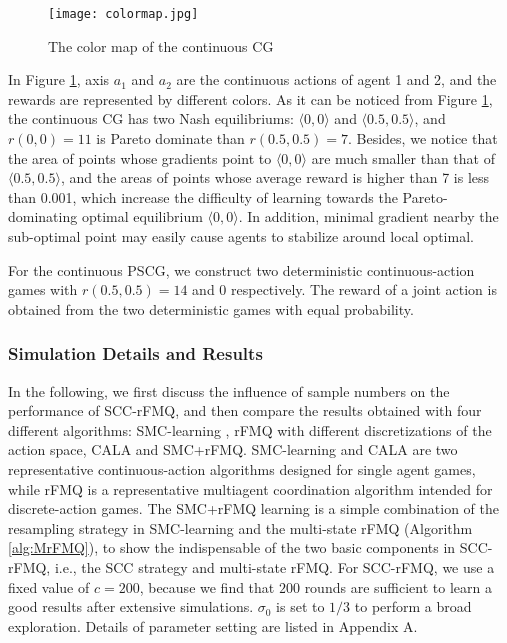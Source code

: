 \documentclass[journal,transmag]{IEEEtran}
\begin{document}


\begin{figure}[h!]
\centering
\texttt{[image: colormap.jpg]}
\caption{The color map of the continuous CG}
\label{fig:colormap}
\end{figure}

In Figure \ref{fig:colormap}, axis $a_1$ and $a_2$ are the continuous actions of agent 1 and 2, and the rewards are represented by different colors. As it can be noticed from Figure \ref{fig:colormap}, the continuous CG has two Nash equilibriums: $\langle 0,0\rangle$ and $\langle 0.5,0.5\rangle$, and $r(0,0)=11$ is Pareto dominate than $r(0.5,0.5)=7$. Besides, we notice that the area of points whose gradients point to $\langle 0,0\rangle$ are much smaller than that of $\langle 0.5,0.5\rangle$,  and the areas of points whose average reward is higher than 7 is less than 0.001, which increase the difficulty of learning towards the Pareto-dominating optimal equilibrium $\langle 0,0\rangle$. In addition, minimal gradient nearby the sub-optimal point may easily cause agents to stabilize around local optimal.

For the continuous PSCG, we construct two deterministic continuous-action games with $r(0.5,0.5)=14$ and $0$ respectively. The reward of a joint action is obtained from the two deterministic games with equal probability.

\subsubsection{Simulation Details and Results}

In the following, we first discuss the influence of sample numbers on the performance of SCC-rFMQ, and then compare the results obtained with four different algorithms: SMC-learning \cite{Lazaric2007Reinforcement}, rFMQ \cite{Matignon2012} with different discretizations of the action space, CALA \cite{Thathachar2004Networks} and SMC+rFMQ. SMC-learning and CALA are two representative continuous-action algorithms designed for single agent games, while rFMQ is a representative multiagent coordination algorithm intended for discrete-action games. The SMC+rFMQ learning is a simple combination of the resampling strategy in SMC-learning and the multi-state rFMQ (Algorithm \ref{alg:MrFMQ}), to show the indispensable of the two basic components in SCC-rFMQ, i.e., the SCC strategy and multi-state rFMQ. For SCC-rFMQ, we use a fixed value of $c=200$, because we find that $200$ rounds are sufficient to learn a good results after extensive simulations. $\sigma_0$ is set to $1/3$ to perform a broad exploration. Details of parameter setting are listed in Appendix A.
\end{document}
